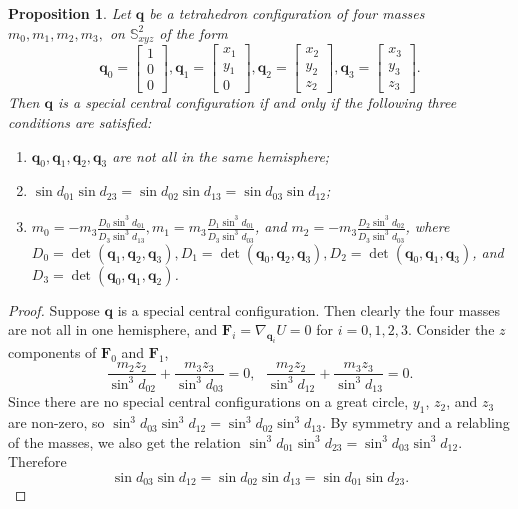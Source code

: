 \documentclass[12pt]{amsart}
\newtheorem{proposition}{Proposition}
\theoremstyle{definition}
\def \mb{\mathbb}
\def \S{\mb S}        %
\newcommand {\q} {\mathbf{q}}
\newcommand {\F} {\mathbf{F}}
\begin{document}
{\begin{proposition} Let $\q$ be a tetrahedron configuration of four masses $m_0, m_1, m_2, m_3,$ on $\S^2_{xyz}$ of the form
$$\q_0=\begin{bmatrix}1\\0\\0\end{bmatrix}, \q_1=\begin{bmatrix}x_1\\y_1\\0\end{bmatrix}, \q_2=\begin{bmatrix}x_2\\y_2\\z_2\end{bmatrix}, \q_3=\begin{bmatrix}x_3\\y_3\\z_3\end{bmatrix}.$$
Then $\q$ is a special central configuration if and only if the following three conditions are satisfied:
\begin{enumerate}
\item $\q_0, \q_1, \q_2, \q_3$ are not all in the same hemisphere;
\item $\sin{d_{01}}\sin{d_{23}}=\sin{d_{02}}\sin{d_{13}}=\sin{d_{03}}\sin{d_{12}}$;
\item $m_0=-m_3\frac{D_0\sin^3 {d_{01}}}{D_3\sin^3 {d_{13}}}, m_1=m_3\frac{D_1\sin^3{d_{01}}}{D_3\sin^3{d_{03}}}$, and $m_2=-m_3\frac{D_2\sin^3{d_{02}}}{D_3\sin^3{d_{03}}}$, where $D_0=\det(\q_1, \q_2, \q_3), D_1=\det(\q_0, \q_2, \q_3), D_2=\det(\q_0, \q_1, \q_3)$, and $D_3=\det(\q_0, \q_1, \q_2)$.
\end{enumerate}
\end{proposition}
\begin{proof}
Suppose $\q$ is a special central configuration. Then clearly the four masses are not all in one hemisphere, and $\F_i=\nabla_{\q_i} U=0$ for $i=0,1,2,3$. Consider the $z$ components of $\F_0$ and $\F_1$, $$\frac{m_2z_2}{\sin^3{d_{02}}}+\frac{m_3z_3}{\sin^3{d_{03}}}=0,\ \ \ \frac{m_2z_2}{\sin^3{d_{12}}}+\frac{m_3z_3}{\sin^3{d_{13}}}=0.$$
Since there are no special central configurations on a great circle, $y_1$, $z_2$, and $z_3$ are non-zero, so $\sin^3{d_{03}}\sin^3{d_{12}}=\sin^3{d_{02}}\sin^3{d_{13}}$. By symmetry and a relabling of the masses, we also get the relation $\sin^3{d_{01}}\sin^3{d_{23}}=\sin^3{d_{03}}\sin^3{d_{12}}$. Therefore $$\sin{d_{03}}\sin{d_{12}}=\sin{d_{02}}\sin{d_{13}}=\sin{d_{01}}\sin{d_{23}}.$$

\end{proof}}
\end{document}
